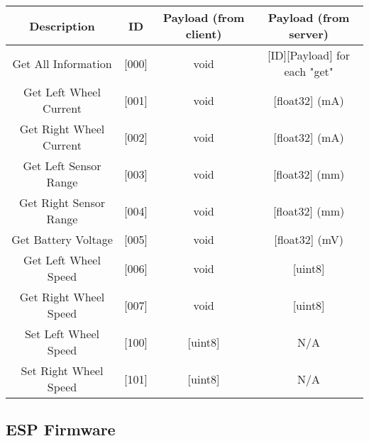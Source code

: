 \begin{table}[!htb]
  \centering
  \renewcommand{\arraystretch}{1.2}
  \begin{tabular}{ |c|c|c|c| }
    \hline
    \textbf{Description}         & \textbf{ID}        & \textbf{Payload (from client)}      & \textbf{Payload (from server)}    \\
    \hline
    Get All Information          & [000]              & void                                & [ID][Payload] for each "get"      \\
    \hline
    Get Left Wheel Current       & [001]              & void                                & [float32] (mA)                    \\
    \hline
    Get Right Wheel Current      & [002]              & void                                & [float32] (mA)                    \\
    \hline
    Get Left Sensor Range        & [003]              & void                                & [float32] (mm)                    \\
    \hline
    Get Right Sensor Range       & [004]              & void                                & [float32] (mm)                    \\
    \hline
    Get Battery Voltage          & [005]              & void                                & [float32] (mV)                    \\
    \hline
    Get Left Wheel Speed         & [006]              & void                                & [uint8]                           \\
    \hline
    Get Right Wheel Speed        & [007]              & void                                & [uint8]                           \\
    \hline
    Set Left Wheel Speed         & [100]              & [uint8]                             & N/A                               \\
    \hline
    Set Right Wheel Speed        & [101]              & [uint8]                             & N/A                               \\
    \hline
  \end{tabular}
  \caption{}
  \label{tab:protocolMessages}
\end{table}

\subsection{ESP Firmware}

